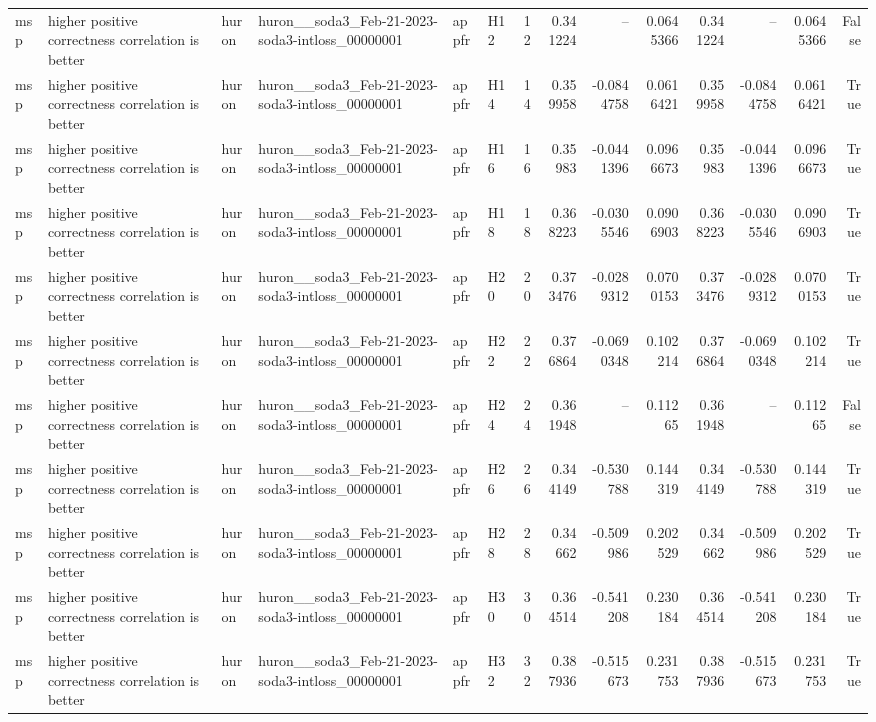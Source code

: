 \begin{longtable}{llllllrrrrrrrr}
msp & higher positive correctness correlation is better & huron & huron\_\_soda3\_Feb-21-2023-soda3-intloss\_00000001 & appfr & H12 & 12 & 0.341224 & -- & 0.0645366 & 0.341224 & -- & 0.0645366 & False \\
msp & higher positive correctness correlation is better & huron & huron\_\_soda3\_Feb-21-2023-soda3-intloss\_00000001 & appfr & H14 & 14 & 0.359958 & -0.0844758 & 0.0616421 & 0.359958 & -0.0844758 & 0.0616421 & True \\
msp & higher positive correctness correlation is better & huron & huron\_\_soda3\_Feb-21-2023-soda3-intloss\_00000001 & appfr & H16 & 16 & 0.35983 & -0.0441396 & 0.0966673 & 0.35983 & -0.0441396 & 0.0966673 & True \\
msp & higher positive correctness correlation is better & huron & huron\_\_soda3\_Feb-21-2023-soda3-intloss\_00000001 & appfr & H18 & 18 & 0.368223 & -0.0305546 & 0.0906903 & 0.368223 & -0.0305546 & 0.0906903 & True \\
msp & higher positive correctness correlation is better & huron & huron\_\_soda3\_Feb-21-2023-soda3-intloss\_00000001 & appfr & H20 & 20 & 0.373476 & -0.0289312 & 0.0700153 & 0.373476 & -0.0289312 & 0.0700153 & True \\
msp & higher positive correctness correlation is better & huron & huron\_\_soda3\_Feb-21-2023-soda3-intloss\_00000001 & appfr & H22 & 22 & 0.376864 & -0.0690348 & 0.102214 & 0.376864 & -0.0690348 & 0.102214 & True \\
msp & higher positive correctness correlation is better & huron & huron\_\_soda3\_Feb-21-2023-soda3-intloss\_00000001 & appfr & H24 & 24 & 0.361948 & -- & 0.11265 & 0.361948 & -- & 0.11265 & False \\
msp & higher positive correctness correlation is better & huron & huron\_\_soda3\_Feb-21-2023-soda3-intloss\_00000001 & appfr & H26 & 26 & 0.344149 & -0.530788 & 0.144319 & 0.344149 & -0.530788 & 0.144319 & True \\
msp & higher positive correctness correlation is better & huron & huron\_\_soda3\_Feb-21-2023-soda3-intloss\_00000001 & appfr & H28 & 28 & 0.34662 & -0.509986 & 0.202529 & 0.34662 & -0.509986 & 0.202529 & True \\
msp & higher positive correctness correlation is better & huron & huron\_\_soda3\_Feb-21-2023-soda3-intloss\_00000001 & appfr & H30 & 30 & 0.364514 & -0.541208 & 0.230184 & 0.364514 & -0.541208 & 0.230184 & True \\
msp & higher positive correctness correlation is better & huron & huron\_\_soda3\_Feb-21-2023-soda3-intloss\_00000001 & appfr & H32 & 32 & 0.387936 & -0.515673 & 0.231753 & 0.387936 & -0.515673 & 0.231753 & True \\

\end{longtable}
